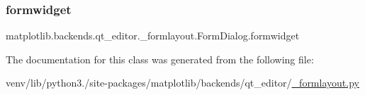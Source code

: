 \subsubsection{\texorpdfstring{formwidget}{formwidget}}
{\footnotesize\ttfamily matplotlib.\+backends.\+qt\+\_\+editor.\+\_\+formlayout.\+Form\+Dialog.\+formwidget}



The documentation for this class was generated from the following file\+:\begin{DoxyCompactItemize}
\item 
venv/lib/python3./site-\/packages/matplotlib/backends/qt\+\_\+editor/\hyperlink{__formlayout_8py}{\+\_\+formlayout.\+py}\end{DoxyCompactItemize}
